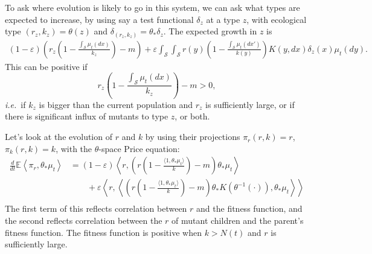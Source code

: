 \documentclass[11pt]{amsart}
\theoremstyle{remark}
\theoremstyle{definition}
\begin{document}
To ask where evolution is likely to go in this system, we can ask what types
are expected to increase, by using say a test functional $\delta_z$
at a type $z$,
with ecological type $(r_z,k_z)=\theta(z)$ and 
$\delta_{(r_z,k_z)}=\theta_*\delta_z$.
The expected growth in $z$ is
\begin{align*}
	(1-\varepsilon) \left( r_z \left( 1 - \frac{\int_{\mathcal{S}} \mu_t(dx)}{k_z} \right) - m \right) + \varepsilon \int_{\mathcal{S}}\int_{\mathcal{S}}  r(y) \left( 1 - \frac{\int_{\mathcal{S}} \mu_t(dx')}{k(y)} \right) K(y,dx) \delta_z(x) \mu_t(dy).
\end{align*}
This can be positive if 
\[ r_z \left( 1 - \frac{\int_{\mathcal{S}} \mu_t(dx)}{k_z} \right) - m > 0, \]
\emph{i.e.}\ if $k_z$ is bigger than the current population and $r_z$ is
sufficiently large,
or if there is significant influx of mutants to type $z$, or both.

Let's look at the evolution of $r$ and $k$ by using their projections
$\pi_r(r,k)=r$, $\pi_k(r,k)=k$, with the $\theta$-space Price equation:
\begin{align*}
	\frac{d}{dt}\mathbb{E}\left\langle \pi_r, \theta_{*}\mu_t \right\rangle
	&= (1-\varepsilon) \left\langle r, \left( r \left( 1 - \frac{\langle 1, \theta_*{\mu_t}\rangle}{k} \right) - m \right) \theta_*\mu_t \right\rangle \\
	& \qquad\mbox{} + \varepsilon \left\langle r, \left\langle \left( r \left( 1 - \frac{\langle 1, \theta_*{\mu_t}\rangle}{k} \right) - m \right) \theta_*K(\theta^{-1}(\cdot)), \theta_{*}\mu_t \right\rangle \right\rangle \\
\end{align*}
The first term of this reflects correlation between $r$ and the
fitness function,
and the second reflects correlation between the $r$ of 
mutant children and the parent's fitness function.
The fitness function is positive when $k>N(t)$ and $r$ is sufficiently
large.
\end{document}

